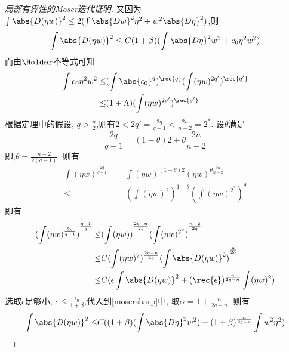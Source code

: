 \begin{proof}[局部有界性的Moser迭代证明]
    又因为 $\int \abs{D(\eta w)}^2 \le 2(\int \abs{Dw}^2\eta^2 + w^2\abs{D\eta}^2)$,则
    \begin{equation}\label{mosersharp}
        \int\abs{D(\eta w)}^2 \le C(1+\beta)(\int \abs{D\eta}^2 w^2 + c_0\eta^2 w^2)
    \end{equation}
    而由$\Holder$不等式可知
    \begin{equation}
        \begin{split}
            \int c_0\eta^2 w^2 \le & (\int \abs{c_0}^q)^\rec{q}(\int (\eta w)^{2q'})^\rec{q'} \\
            \le & (1+\Lambda)(\int (\eta w)^{2q'})^\rec{q'}
        \end{split}
    \end{equation}
    根据定理中的假设, $q > \frac{n}{2}$,则有$2< 2q' = \frac{2q}{q-1} < \frac{2n }{n-2} =2^*$. 设$\theta$满足
    \begin{equation}
        \frac{2q}{q-1}=(1-\theta)2+\theta\frac{2n}{n-2}
    \end{equation}
    即,$\theta=\frac{n-2}{2(q-1)}$. 则有
    \begin{equation}
        \begin{split}
            \int (\eta w)^{\frac{2q}{q-1}} =  & \int (\eta w)^{(1-\theta)2} (\eta w)^{\theta \frac{2n}{n-2}} \\
            \le & (\int (\eta w)^2)^{1-\theta}(\int (\eta w)^{2^*})^\theta
        \end{split}
    \end{equation}
    即有
    \begin{equation}
        \begin{split}
            {(\int (\eta w)^{\frac{2q }{q-1}})}^\frac{q-1}{q} \le & {(\int (\eta w))}^\frac{2q-n}{2q} {(\int (\eta w)^{2^*})}^\frac{n-2}{2q} \\
            \le & C(\int (\eta w)^2)^\frac{2q-n}{2q}{(\int \abs{D(\eta w)}^2)}^\frac{n }{2q} \\
            \le & C(\epsilon\int \abs{D(\eta w)}^2+ (\rec{\epsilon})^\frac{n }{2q-n}\int (\eta w)^2)
        \end{split}
    \end{equation}
    选取$\epsilon$足够小, $ \epsilon \le \frac{\epsilon_0}{1+\beta}$,代入到\eqref{mosersharp}中, 取$\alpha=1+\frac{n}{2q-n}$. 则有
    \begin{equation}
        \begin{split}
            \int \abs{D(\eta w)}^2 \le & C((1+\beta)(\int \abs{D\eta}^2w^2) + (1+\beta)^{\frac{n }{2q-n}} \int w^2 \eta^2) \\

\end{split}
\end{equation}
\end{proof}
